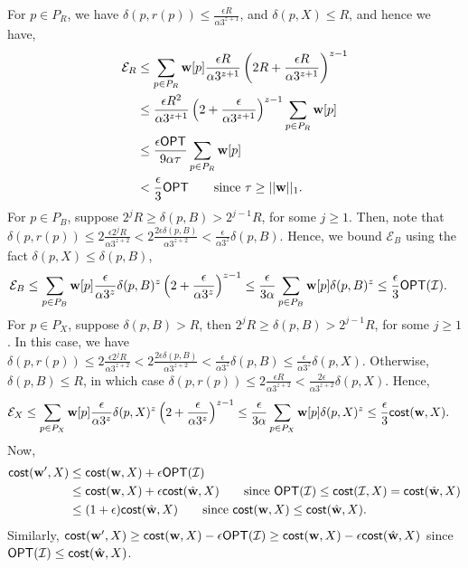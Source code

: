 \documentclass[11pt]{article}
\newcommand{\opt}{\ensuremath{\textsf{OPT}}}
\newcommand{\cost}{\ensuremath{\textsf{cost}}}
\newcommand{\vecw}{{\bf w}\xspace}
\newcommand{\vcw}{{\bf w}\xspace}
\newcommand{\cE}{\ensuremath{\mathcal{E}}\xspace}
\newcommand{\cI}{\ensuremath{\mathcal{I}}\xspace}
\begin{document}
%
For $p \in P_R$, we have $\delta(p,r(p)) \le \frac{\epsilon R}{\alpha 3^{z+1}} $, and $\delta(p,X)\le R$, and hence we have,
\begin{align*}
\cE_R &\le \sum_{p\in P_R} \vecw[p] \frac{\epsilon R}{\alpha  3^{z+1}}\left(2R+\frac{\epsilon R}{\alpha  3^{z+1}}\right)^{z-1} \\
& \le \frac{\epsilon R^2}{\alpha  3^{z+1}} \left(2+\frac{\epsilon}{\alpha  3^{z+1}}\right)^{z-1} \sum_{p\in P_R} \vecw[p] \\
&\le \frac{\epsilon \opt}{9 \alpha\tau} \sum_{p\in P_R} \vecw[p] \\
&< \frac{\epsilon }{3}\opt \qquad \text{since } \tau \ge ||\vecw||_1. \\
\end{align*}
%
For $p \in P_B$, suppose  $2^j R \ge \delta(p,B) > 2^{j-1} R$, for some $j\ge 1$. Then, note that
$
\delta(p,r(p)) \le 2\frac{\epsilon 2^{j} R}{\alpha  3^{z+2}} < 2\frac{2\epsilon \delta(p,B)}{\alpha 3^{z+2}} < \frac{\epsilon}{\alpha  3^z} \delta(p,B)$. 
Hence, we bound $\cE_B$ using  the fact $\delta(p,X) \le \delta(p,B)$,
\begin{align*}
    \cE_B &\le \sum_{p\in P_B} \vecw[p] \frac{\epsilon}{\alpha  3^z} \delta(p,B)^z \left(2+ \frac{\epsilon}{\alpha 3^z} \right)^{z-1}
    \le \frac{\epsilon}{3\alpha} \sum_{p\in P_B} \vecw[p]  \delta(p,B)^z
    \le  \frac{\epsilon}{3}\opt(\cI).
\end{align*}
%
For $p \in P_X$, suppose $\delta(p,B) > R$, then $2^j R \ge \delta(p,B) > 2^{j-1} R$, for some $j\ge 1$. In this case, we have
$
\delta(p,r(p)) \le 2\frac{\epsilon 2^{j} R}{\alpha  3^{z+2}} < 2\frac{2\epsilon \delta(p,B)}{\alpha 3^{z+2}} < \frac{\epsilon}{\alpha  3^z} \delta(p,B) \le \frac{\epsilon}{\alpha  3^z} \delta(p,X)$. Otherwise, $\delta(p,B) \le R$, in which case $\delta(p,r(p)) \le 2\frac{\epsilon R}{\alpha  3^{z+2}} < \frac{2\epsilon}{\alpha 3^{z+2}} \delta(p,X)$.
Hence, 
\begin{align*}
    \cE_X &\le \sum_{p\in P_X} \vecw[p] \frac{\epsilon}{\alpha 3^z} \delta(p,X)^z \left(2+ \frac{\epsilon}{\alpha 3^z} \right)^{z-1} 
    \le \frac{\epsilon}{3\alpha} \sum_{p\in P_X} \vecw[p]  \delta(p,X)^z
    \le  \frac{\epsilon}{3}\cost(\vecw,X).
\end{align*}
Now, 
   \begin{align*}
       \cost(\vcw',X) &\le \cost(\vcw,X) + \epsilon \opt(\cI)\\
       &\le  \cost(\vcw,X) + \epsilon \cost(\hat{\vcw},X) \qquad \text{since } \opt(\cI) \le \cost(\cI,X) = \cost(\hat{\vcw},X)\\
       &\le (1+\epsilon) \cost(\hat{\vcw},X) \qquad \text{since } \cost(\vcw,X) \le \cost(\hat{\vcw},X).
   \end{align*}
   Similarly,       $\cost(\vcw',X) \ge \cost(\vcw,X) - \epsilon \opt(\cI)
       \ge  \cost(\vcw,X) - \epsilon \cost(\hat{\vcw},X)$  since  $\opt(\cI) \le  \cost(\hat{\vcw},X)$.
    
\end{document}
